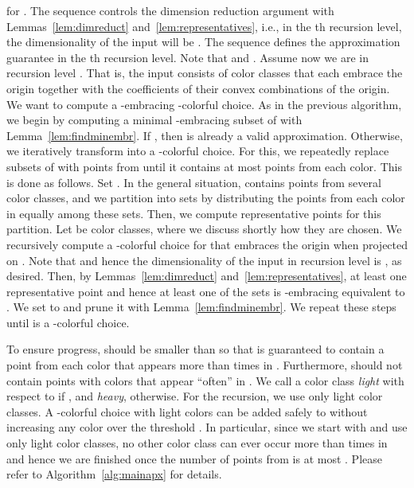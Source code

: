 for . The sequence  controls the dimension reduction
argument with Lemmas~\ref{lem:dimreduct} and~\ref{lem:representatives}, 
i.e., in the th recursion level, the dimensionality of the input 
will be . The sequence  defines the approximation guarantee 
in the th recursion level.  Note that  and 
. Assume now we are in recursion 
level . That is, the input consists of 
color classes  that each embrace the
origin together with the coefficients of their convex combinations 
of the origin.
We want to compute a -embracing -colorful choice.
As in the previous algorithm, we begin by computing a minimal 
-embracing subset  of  with Lemma~\ref{lem:findminembr}. 
If , then  is already a valid approximation. 
Otherwise, we iteratively transform  into a -colorful choice. 
For this, we repeatedly replace subsets
of  with points from 
until it contains at most  points from each color. This 
is done as follows. Set . 
In the general situation,  contains points from several
color classes, and we partition  into sets  by
distributing the points from each color in  equally among 
these  sets. Then,
we compute representative points  for this partition. 
Let
 be
 color classes, where we discuss shortly how they are chosen.
We recursively compute a -colorful choice  for
 that embraces the
origin when projected on . 
Note that 
and hence the dimensionality of the input in recursion level 
 is , as desired. Then, by Lemmas~\ref{lem:dimreduct}
and~\ref{lem:representatives}, at least one representative 
point  and
hence at least one of the sets  is
-embracing equivalent to . We set  to  and prune it with Lemma~\ref{lem:findminembr}. 
We repeat these steps until  is a -colorful choice. 

To ensure progress,  should be smaller than  so that 
 is guaranteed to contain a point from each 
color that appears more than  times
in . Furthermore,  should not contain points with colors that appear
``often'' in . We call a color class  \emph{light} with 
respect to  if , and 
\emph{heavy}, otherwise. For the recursion, we use only light 
color classes. A -colorful choice with light colors can be 
added safely to  without increasing any color over the
threshold . In particular, since we start with  and 
use only light color classes, no other color class can ever occur 
more than  times in  and hence we are finished once the 
number of points from  is at most .
Please refer to Algorithm~\ref{alg:mainapx} for details.

